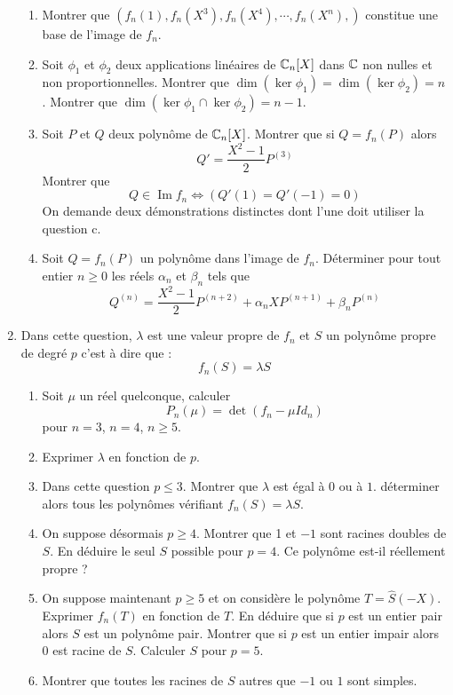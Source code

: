 \begin{enumerate}
\begin{enumerate}
       \item Montrer que $(f_n(1),f_n(X^3),f_n(X^4), \cdots , f_n(X^n),)$ constitue une base de l'image de $f_n$.
       \item Soit $\phi_1$ et $\phi_2$ deux applications linéaires de $\mathbb{C}_n[X]$ dans $\mathbb{C}$ non nulles et non proportionnelles. Montrer que $\dim (\ker \phi_1)=\dim (\ker \phi_2)=n$. Montrer que $\dim (\ker \phi_1 \cap \ker \phi_2) = n-1$.
       \item Soit $P$ et $Q$ deux polynôme de $\mathbb{C}_n[X]$. Montrer que si $Q=f_n(P)$ alors
\[Q' = \frac{X^2-1}{2}P^{(3)}\]
Montrer que
\[Q \in \mathop{\mathrm{Im}} f_n \Leftrightarrow \left( Q'(1)=Q'(-1)=0\right) \]
On demande deux démonstrations distinctes dont l'une doit utiliser la question c.
       \item Soit $Q=f_n(P)$ un polynôme dans l'image de $f_n$. Déterminer pour tout entier $n\geq 0$ les réels $\alpha_n$ et $\beta_n$ tels que
\[Q^{(n)}=\frac{X^2-1}{2}P^{(n+2)}+\alpha_nXP^{(n+1)}+\beta_nP^{(n)}\]
\end{enumerate}
\item Dans cette question, $\lambda$ est une valeur propre de $f_n$ et $S$ un polynôme propre de degré $p$ c'est à dire que :
\[f_n(S)=\lambda S\]
   \begin{enumerate}
    \item Soit $\mu$ un réel quelconque, calculer
    \[P_n(\mu)=\det (f_n-\mu Id_n)\]
    pour $n=3$, $n=4$, $n\geq 5$.
    \item Exprimer $\lambda$ en fonction de $p$.
    \item Dans cette question $p\leq 3$. Montrer que $\lambda$ est égal à $0$ ou à $1$. déterminer alors tous les polynômes vérifiant $f_n(S)=\lambda S$.
    \item On suppose désormais $p\geq 4$. Montrer que 1 et $-1$ sont racines doubles de $S$. En déduire le seul $S$ possible pour $p=4$. Ce polynôme est-il réellement propre ?
    \item On suppose maintenant $p\geq 5$ et on considère le polynôme $T=\hat{S}(-X)$.\newline
    Exprimer $f_n(T)$ en fonction de $T$. \newline
    En déduire que si $p$ est un entier pair alors $S$ est un polynôme pair.\newline
    Montrer que si $p$ est un entier impair alors $0$ est racine de $S$.\newline
    Calculer $S$ pour $p=5$.
    \item Montrer que toutes les racines de $S$ autres que $-1$ ou $1$ sont simples.
\end{enumerate}
\end{enumerate}
